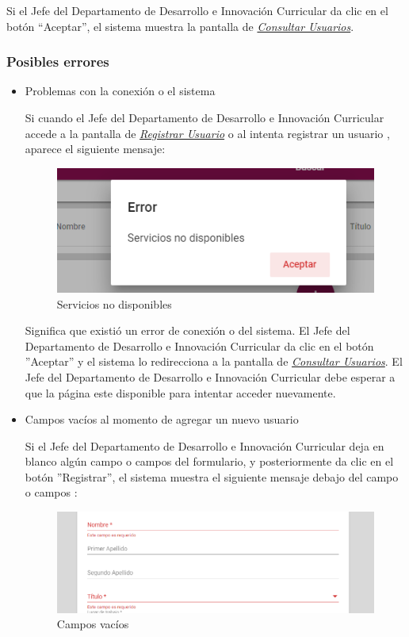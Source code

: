 Si el Jefe del Departamento de Desarrollo e Innovación Curricular  da clic en el botón “Aceptar”, el sistema muestra la pantalla de  \hyperlink{consultarUs}{\textit{Consultar Usuarios}}.

\subsubsection{Posibles errores}

\begin{itemize}
	\item Problemas con la conexión o el sistema
	
	Si cuando el Jefe del Departamento de Desarrollo e Innovación Curricular accede a la pantalla de \hyperlink{registrarUs}{\textit{Registrar Usuario}} o al intenta registrar un usuario , aparece el siguiente mensaje:
	
	\begin{figure}[H]
		\centering
		\includegraphics[width=0.4\linewidth]{images/SP5/MSGSN}
		\caption{Servicios no disponibles}
		\label{SND}
		
	\end{figure}
	
	Significa que existió un error de conexión o del sistema. El Jefe del Departamento de Desarrollo e Innovación Curricular da clic en el botón ''Aceptar'' y el sistema lo redirecciona  a la pantalla de \hyperlink{consultarUs}{\textit{Consultar Usuarios}}. El Jefe del Departamento de Desarrollo e Innovación Curricular debe esperar a que la página este disponible para intentar acceder nuevamente.
	
	\item Campos vacíos al momento de agregar un nuevo usuario
	
	Si el Jefe del Departamento de Desarrollo e Innovación Curricular deja en blanco algún campo o campos del formulario, y posteriormente da clic en el botón ''Registrar'', el sistema muestra el siguiente mensaje debajo del campo o campos :
	
	\begin{figure}[H]
		\centering
		\includegraphics[width=0.4\linewidth]{images/SP5/MSG44}
		\caption{Campos vacíos}
		\label{mensaje44}
	\end{figure}
	

\end{itemize}
